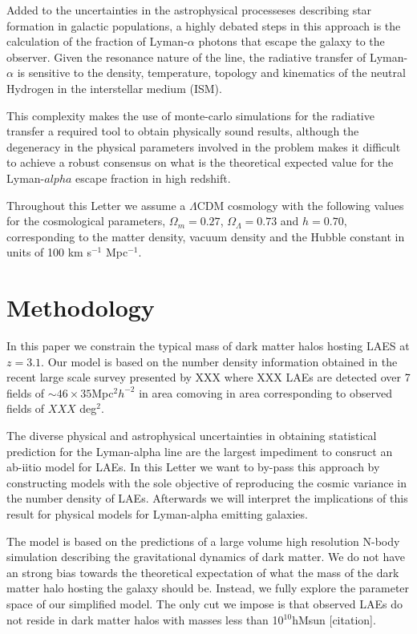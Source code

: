 \documentclass{emulateapj}
\begin{document}
Added to the uncertainties in the astrophysical processeses describing star formation in galactic populations, a highly debated steps in this approach is the calculation of the fraction of Lyman-$\alpha$ photons that escape the galaxy to the observer. Given the resonance nature of the line, the radiative transfer of Lyman-$\alpha$ is sensitive to the density, temperature, topology and kinematics of the neutral Hydrogen in the interstellar medium (ISM). 

This complexity makes the use of monte-carlo simulations for the radiative transfer a required tool to obtain physically sound results, although the degeneracy in the physical parameters involved in the problem makes it difficult to achieve a robust consensus on what is the theoretical expected value for the Lyman-$alpha$ escape fraction in high redshift.


Throughout this Letter we assume a $\Lambda$CDM cosmology with the following values for the cosmological parameters, $\Omega_{m}=0.27$, $\Omega_{\Lambda}=0.73$ and $h=0.70$, corresponding to the matter density, vacuum density and the Hubble constant in units of 100 km s$^{-1}$ Mpc$^{-1}$.

\section{Methodology}
In this paper we constrain the typical mass of dark matter halos hosting LAES at $z=3.1$. Our model is based on the number density information obtained in the recent large scale survey presented by XXX where XXX LAEs are detected over 7 fields of $\sim 46 \times 35$Mpc$^{2}h^{-2}$ in area comoving in area corresponding to observed fields of $XXX$ deg$^{2}$. 

The diverse physical and astrophysical uncertainties in obtaining statistical prediction for the Lyman-alpha line are the largest impediment to consruct an ab-iitio model for LAEs. In this Letter we want to by-pass this approach by constructing models with the sole objective of reproducing the cosmic variance in the number density of LAEs. Afterwards we will interpret the implications of this result for physical models for Lyman-alpha emitting galaxies.

The model is based on the predictions of a large volume high resolution N-body simulation describing the gravitational dynamics of dark matter. We do not have an strong bias towards the theoretical expectation of what the mass of the dark matter halo hosting the galaxy should be.  Instead, we fully explore the parameter space of our simplified model. The only cut we impose is that observed LAEs do not reside in dark matter halos with masses less than 10$^{10}$hMsun [citation]. 
\end{document}
